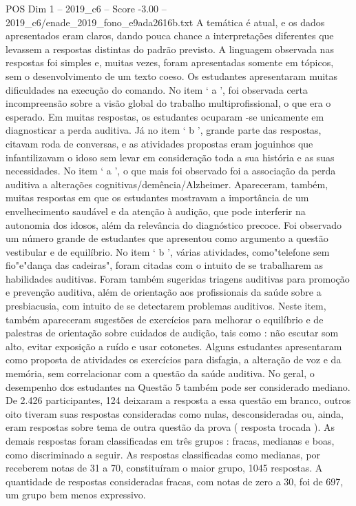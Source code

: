 \begin{textsample}{POS Dim 1 – 2019\_c6 – Score -3.00 – 2019\_c6/enade\_2019\_fono\_e9ada2616b.txt}
A temática é atual, e os dados apresentados eram claros, dando pouca chance a interpretações diferentes que levassem a respostas distintas do padrão previsto.
A linguagem observada nas respostas foi simples e, muitas vezes, foram apresentadas somente em tópicos, sem o desenvolvimento de um texto coeso.
Os estudantes apresentaram muitas dificuldades na execução do comando.
No item ‘ a ’, foi observada certa incompreensão sobre a visão global do trabalho multiprofissional, o que era o esperado.
Em muitas respostas, os estudantes ocuparam -se unicamente em diagnosticar a perda auditiva.
Já no item ‘ b ’, grande parte das respostas, citavam roda de conversas, e as atividades propostas eram joguinhos que infantilizavam o idoso sem levar em consideração toda a sua história e as suas necessidades.
No item ‘ a ’, o que mais foi observado foi a associação da perda auditiva a alterações cognitivas/demência/Alzheimer.
Apareceram, também, muitas respostas em que os estudantes mostravam a importância de um envelhecimento saudável e da atenção à audição, que pode interferir na autonomia dos idosos, além da relevância do diagnóstico precoce.
Foi observado um número grande de estudantes que apresentou como argumento a questão vestibular e de equilíbrio.
No item ‘ b ’, várias atividades, como"telefone sem fio"e"dança das cadeiras", foram citadas com o intuito de se trabalharem as habilidades auditivas.
Foram também sugeridas triagens auditivas para promoção e prevenção auditiva, além de orientação aos profissionais da saúde sobre a presbiacusia, com intuito de se detectarem problemas auditivos.
Neste item, também apareceram sugestões de exercícios para melhorar o equilíbrio e de palestras de orientação sobre cuidados de audição, tais como : não escutar som alto, evitar exposição a ruído e usar cotonetes.
Alguns estudantes apresentaram como proposta de atividades os exercícios para disfagia, a alteração de voz e da memória, sem correlacionar com a questão da saúde auditiva.
No geral, o desempenho dos estudantes na Questão 5 também pode ser considerado mediano.
De 2.426 participantes, 124 deixaram a resposta a essa questão em branco, outros oito tiveram suas respostas consideradas como nulas, desconsideradas ou, ainda, eram respostas sobre tema de outra questão da prova ( resposta trocada ).
As demais respostas foram classificadas em três grupos : fracas, medianas e boas, como discriminado a seguir.
As respostas classificadas como medianas, por receberem notas de 31 a 70, constituíram o maior grupo, 1045 respostas.
A quantidade de respostas consideradas fracas, com notas de zero a 30, foi de 697, um grupo bem menos expressivo.

\end{textsample}
